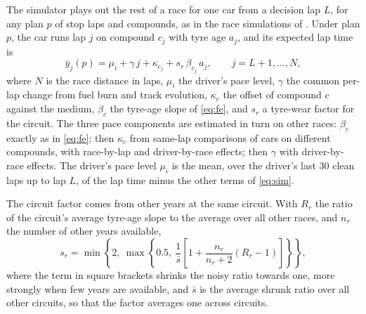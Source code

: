 \documentclass[12pt]{article}
\begin{document}
The simulator plays out the rest of a race for one car from a decision lap $L$, for any plan $p$ of stop laps and
compounds, as in the race simulations of \textcite{heilmeier2018,heilmeier2020mc}. Under plan $p$, the car runs lap $j$
on compound $c_j$ with tyre age $a_j$, and its expected lap time is
\begin{equation}\label{eq:sim}
  \bar y_{j}(p) = \mu_i + \gamma\,j + \kappa_{c_j} + s_r\,\beta_{c_j}\,a_j ,\qquad j=L+1,\dots,N,
\end{equation}
where $N$ is the race distance in laps, $\mu_i$ the driver's pace level, $\gamma$ the common per-lap change from fuel burn
and track evolution, $\kappa_{c}$ the offset of compound $c$ against the medium, $\beta_c$ the tyre-age slope of
\cref{eq:fe}, and $s_r$ a tyre-wear factor for the circuit. The three pace components are estimated in turn on other
races: $\beta_c$ exactly as in \cref{eq:fe}; then $\kappa_c$ from same-lap comparisons of cars on different compounds,
with race-by-lap and driver-by-race effects; then $\gamma$ with driver-by-race effects. The driver's pace level $\mu_i$
is the mean, over the driver's last 30 clean laps up to lap $L$, of the lap time minus the other terms of \cref{eq:sim}.

The circuit factor comes from other years at the same circuit. With $R_r$ the ratio of the circuit's average tyre-age
slope to the average over all other races, and $n_r$ the number of other years available,
\begin{equation}\label{eq:scale}
  s_r = \min\!\left\{2,\ \max\!\left\{0.5,\ \frac{1}{\bar s}\left[1+\frac{n_r}{n_r+2}\left(R_r-1\right)\right]\right\}\right\},
\end{equation}
where the term in square brackets shrinks the noisy ratio towards one, more strongly when few years are available, and
$\bar s$ is the average shrunk ratio over all other circuits, so that the factor averages one across circuits.
\end{document}

